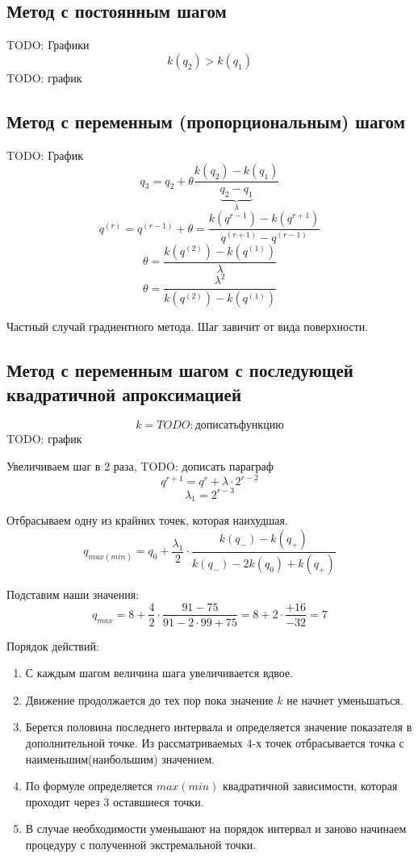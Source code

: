 \documentclass[12pt,a5paper]{scrbook}
\begin{document}
  \subsection{Метод с постоянным шагом}
  TODO: Графики
  $$k(q_2)>k(q_1)$$ TODO: график
  \subsection{Метод с переменным (пропорциональным) шагом}
  TODO: График
  $$q_3 = q_2 + \theta\frac{k(q_2) - k(q_1)}{\underbrace{q_2 - q_1}_{\lambda}}$$
  $$q^{(r)} = q^{(r-1)} + \theta = \frac{k(q^{r-1}) - k(q^{r+1})}{q^{(r+1)} - q^{(r-1)}}$$
  $$\theta = \frac{k(q^{(2)}) - k(q^{(1)})}{\lambda}$$
  $$\theta = \frac{\lambda^2}{k(q^{(2)}) - k(q^{(1)})}$$
  \par
  Частный случай градиентного метода. Шаг завичит от вида поверхности.
  \subsection{Метод с переменным шагом с последующей квадратичной апроксимацией}
  $$k = TODO: дописать функцию$$
  TODO: график
  \par
  Увеличиваем шаг в 2 раза, TODO: дописать параграф
  $$q^{r+1} = q^r + \lambda \cdot 2^{r-2}$$
  $$\lambda_1 = 2^{r-3}$$
  \par
  Отбрасываем одну из крайних точек, которая наихудшая.
  $$q_{max(min)} = q_0 + \frac{\lambda_1}{2} \cdot \frac{k(q_-) - k(q_+)}{k(q_-) - 2k(q_0) + k(q_+)}$$
  \par
  Подставим наши значения:
  $$q_{max} = 8 + \frac{4}{2} \cdot \frac{91 - 75}{91 - 2 \cdot 99 + 75} = 8 + 2 \cdot \frac{+16}{-32} = 7$$
  \par
  Порядок действий:
  \begin{enumerate}
    \item С каждым шагом величина шага увеличивается вдвое.
    \item Движение продолжается до тех пор пока значение $k$ не начнет уменьшаться.
    \item Берется половина последнего интервала и определяется значение показателя в дополнительной точке. Из рассматриваемых 4-х точек отбрасывается точка с наименьшим(наибольшим) значением.
    \item По формуле определяется $max(min)$ квадратичной зависимости, которая проходит через 3 оставшиеся точки.
    \item В случае необходимости уменьшают на порядок интервал и заново начинаем процедуру с полученной экстремальной точки.
  \end{enumerate}
\end{document}
